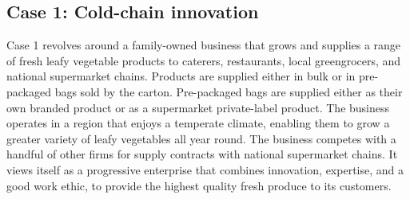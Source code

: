 \begin{table}
\centering
{}
\end{table}

\subsection{Case 1: Cold-chain innovation}

Case 1 revolves around a family-owned business that grows and supplies a range of fresh leafy vegetable products to caterers, restaurants, local greengrocers, and national supermarket chains. Products are supplied either in bulk or in pre-packaged bags sold by the carton. Pre-packaged bags are supplied either as their own branded product or as a supermarket private-label product. The business operates in a region that enjoys a temperate climate, enabling them to grow a greater variety of leafy vegetables all year round. The business competes with a handful of other firms for supply contracts with national supermarket chains. It views itself as a progressive enterprise that combines innovation, expertise, and a good work ethic, to provide the highest quality fresh produce to its customers. \medskip

